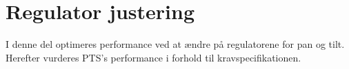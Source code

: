 \part{Regulator justering}
I denne del optimeres performance ved at ændre på regulatorene for pan og tilt.
Herefter vurderes PTS's performance i forhold til kravspecifikationen.

%
